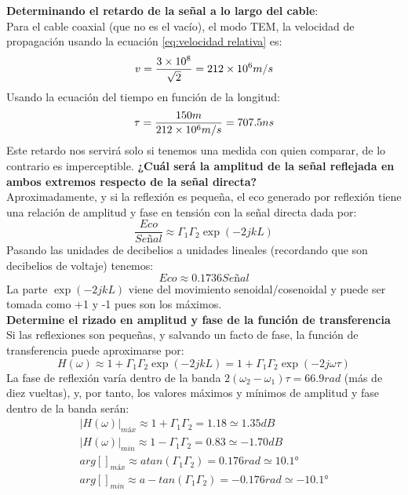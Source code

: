 \documentclass[
	12pt, %
	fleqn, %
	a4paper, %
	oneside, %
]{LegrandOrangeBook}
\begin{document}
\begin{example}[Considere un sistema formado por un transmisor de TV analógica y una antena unidos por un cable coaxial, que consideramos sin pérdidas, de 150m de longitud y lleno de un dieléctrico de constante dieléctrica $\epsilon=2$. La señal de televisión está formada por una portadora de 600 MHz con una banda de modulación de 7.5 MHz. El coeficiente de reflexión a la salida del transmisor es de -10dB, y por un fallo en la conexión a la antena se produce una reflexión a su entrada de -5dB.]
\textbf{Determinando el retardo de la señal a lo largo del cable}:\\
Para el cable coaxial (que no es el vacío), el modo TEM, la velocidad de propagación usando la ecuación \ref{eq:velocidad relativa} es:
\begin{displaymath}
v=\frac{3\times 10^{8}}{\sqrt{2}}=212\times 10^{6}m/s
\end{displaymath}
Usando la ecuación del tiempo en función de la longitud:
\begin{displaymath}
\tau=\frac{150m}{212\times 10^{6}m/s}=707.5ns
\end{displaymath}
Este retardo nos servirá solo si tenemos una medida con quien comparar, de lo contrario es imperceptible.
\textbf{¿Cuál será la amplitud de la señal reflejada en ambos extremos respecto de la señal directa?}\\
Aproximadamente, y si la reflexión es pequeña, el eco generado por reflexión tiene una relación de amplitud y fase en tensión con la señal directa dada por:
\begin{displaymath}
\frac{Eco}{Señal}\approx\Gamma_1\Gamma_2\exp(-2jkL)
\end{displaymath}
Pasando las unidades de decibelios a unidades lineales (recordando que son decibelios de voltaje) tenemos:
\begin{displaymath}
Eco\approx 0.1736 Señal
\end{displaymath}
La parte $\exp(-2jkL)$ viene del movimiento senoidal/cosenoidal y puede ser tomada como +1 y -1 pues son los máximos.\\
\textbf{Determine el rizado en amplitud y fase de la función de transferencia}\\
Si las reflexiones son pequeñas, y salvando un facto de fase, la función de transferencia puede aproximarse por:
\begin{displaymath}
H(\omega)\approx 1+\Gamma_1\Gamma_2\exp(-2jkL)=1+\Gamma_1\Gamma_2\exp(-2j\omega\tau)
\end{displaymath}
La fase de reflexión varía dentro de la banda $2(\omega_2-\omega_1)\tau=66.9 rad$ (más de diez vueltas), y, por tanto, los valores máximos y mínimos de amplitud y fase dentro de la banda serán:
\begin{align*}
|H(\omega)|_{máx}\approx 1+\Gamma_1\Gamma_2=1.18 \simeq 1.35dB\\
|H(\omega)|_{min}\approx 1-\Gamma_1\Gamma_2=0.83 \simeq -1.70dB\\
arg\left[\right]_{máx}\approx atan(\Gamma_1\Gamma_2)=0.176 rad \simeq 10.1°\\
arg\left[\right]_{min}\approx a-tan(\Gamma_1\Gamma_2)=-0.176 rad \simeq -10.1°
\end{align*}
\end{example}
\end{document}
